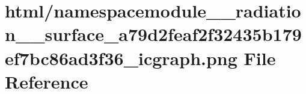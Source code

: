 \hypertarget{namespacemodule____radiation____surface__a79d2feaf2f32435b179ef7bc86ad3f36__icgraph_8png}{}\section{html/namespacemodule\+\_\+\+\_\+radiation\+\_\+\+\_\+surface\+\_\+a79d2feaf2f32435b179ef7bc86ad3f36\+\_\+icgraph.png File Reference}
\label{namespacemodule____radiation____surface__a79d2feaf2f32435b179ef7bc86ad3f36__icgraph_8png}

